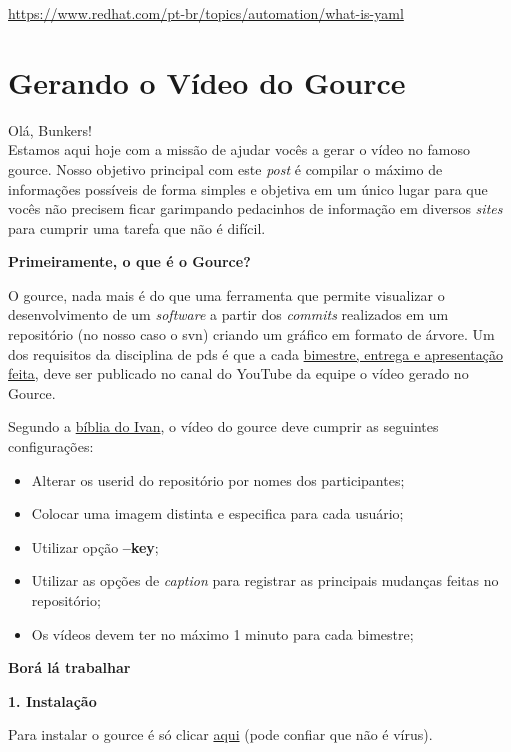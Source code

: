 \noindent\href{https://www.redhat.com/pt-br/topics/automation/what-is-yaml}{https://www.redhat.com/pt-br/topics/automation/what-is-yaml}

\section{Gerando o Vídeo do Gource}
Olá, Bunkers!\\
Estamos aqui hoje com a missão de ajudar vocês a gerar o vídeo no famoso \gls{gource}. Nosso objetivo principal com este \textit{post} é compilar o máximo de informações possíveis de forma simples e objetiva em um único lugar para que vocês não precisem ficar garimpando pedacinhos de informação em diversos \textit{sites} para cumprir uma tarefa que não é difícil.

\textbf{Primeiramente, o que é o Gource?}

O \gls{gource}, nada mais é do que uma ferramenta que permite visualizar o desenvolvimento de um \textit{software} a partir dos \textit{commits} realizados em um repositório (no nosso caso o \acs{svn}) criando um gráfico em formato de árvore.
Um dos requisitos da disciplina de \acs{pds} é que a cada \underline{bimestre, entrega e apresentação feita}, deve ser publicado no canal do YouTube da equipe o vídeo gerado no Gource. 

Segundo a \href{https://dicas.ivanfm.com/programacao/scm/controle-de-versao/gource.html}{bíblia do Ivan}, o vídeo do \gls{gource} deve cumprir as seguintes configurações:
\begin{itemize}
    \item Alterar os userid do repositório por nomes dos participantes;
    \item Colocar uma imagem distinta e especifica para cada usuário;
    \item Utilizar opção \textbf{–key};
    \item Utilizar as opções de \textit{caption} para registrar as principais mudanças feitas no repositório;
    \item Os vídeos devem ter no máximo 1 minuto para cada bimestre; 
\end{itemize}

\textbf{Borá lá trabalhar}

\textbf{1. Instalação}

Para instalar o \gls{gource} é só clicar \href{https://github.com/acaudwell/Gource/releases/download/gource-0.47/gource-0.47.win64-setup.exe}{aqui} (pode confiar que não é vírus).


